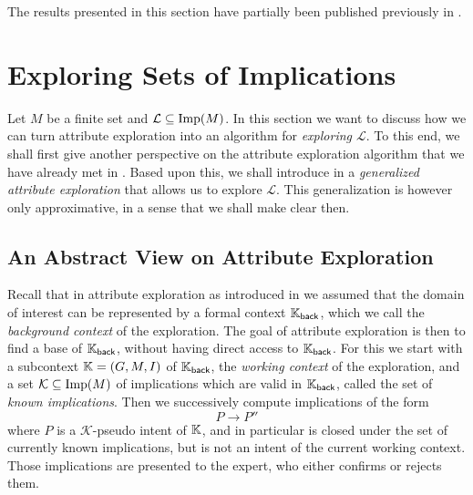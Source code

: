 The results presented in this section have partially been published previously in
\cite{Borch-LTCS-13-04}.

\section{Exploring Sets of Implications}
\label{sec:an-abstract-view}

Let $M$ be a finite set and $\mathcal{L} \subseteq \operatorname{Imp}(M)$.  In this section we want to
discuss how we can turn attribute exploration into an algorithm for \emph{exploring
  $\mathcal{L}$}.  To this end, we shall first give another perspective on the attribute
exploration algorithm that we have already met in .  Based upon this,
we shall introduce in  a \emph{generalized attribute
  exploration} that allows us to explore $\mathcal{L}$.  This generalization is however
only approximative, in a sense that we shall make clear then.

\subsection{An Abstract View on Attribute Exploration}
\label{sec:class-attr-expl}

Recall that in attribute exploration as introduced in  we assumed that
the domain of interest can be represented by a formal context ${\mathbb{K}}_{\mathsf{back}}$,
which we call the \emph{background context} of the exploration.  The goal of attribute
exploration is then to find a base of ${\mathbb{K}}_{\mathsf{back}}$, without having direct
access to ${\mathbb{K}}_{\mathsf{back}}$.  For this we start with a subcontext ${\mathbb{K}} = (G, M,
I)$ of ${\mathbb{K}}_{\mathsf{back}}$, the \emph{working context} of the exploration, and a set
$\mathcal{K} \subseteq \operatorname{Imp}(M)$ of implications which are valid in ${\mathbb{K}}_{\mathsf{back}}$, called the set of \emph{known implications}.  Then we successively
compute implications of the form
\begin{equation*}
  P \to P''
\end{equation*}
where $P$ is a $\mathcal{K}$-pseudo intent of ${\mathbb{K}}$, and in particular is closed under
the set of currently known implications, but is not an intent of the current working
context.  Those implications are presented to the expert, who either confirms or rejects
them.

